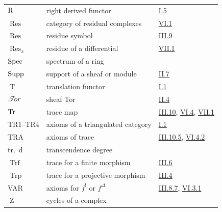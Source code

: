 \begin{longtable}{@{}l p{8cm} l@{}}
	$\operatorname{R}$ & right derived functor & \hyperref[sec:1.5]{I.5} \\
	$\operatorname{Res}$ & category of residual complexes & \hyperref[sec:6.1]{VI.1} \\
	$\operatorname{Res}$ & residue symbol & \hyperref[sec:3.9]{III.9} \\
	$\operatorname{Res}_x$ & residue of a differential & \hyperref[sec:7.1]{VII.1} \\
	$\operatorname{Spec}$ & spectrum of a ring & \\
	$\operatorname{Supp}$ & support of a sheaf or module & \hyperref[sec:2.7]{II.7} \\
	$\operatorname{T}$ & translation functor & \hyperref[sec:1.1]{I.1} \\
	$\mathop{\mathscr{T}\!or}\nolimits$ & sheaf Tor & \hyperref[sec:2.4]{II.4}  \\
	$\operatorname{Tr}$ & trace map & \hyperref[sec:3.10]{III.10}, \hyperref[sec:6.4]{VI.4}, \hyperref[sec:7.1]{VII.1} \\
	TR1--TR4 & axioms of a triangulated category & \hyperref[sec:1.1]{I.1} \\
	TRA & axioms of trace & \hyperref[thm:3.10.5]{III.10.5}, \hyperref[thm:6.4.2]{VI.4.2} \\
	tr.\ d & transcendence degree & \\
	$\operatorname{Trf}$ & trace for a finite morphism & \hyperref[sec:3.6]{III.6} \\
	$\operatorname{Trp}$ & trace for a projective morphism & \hyperref[sec:3.4]{III.4} \\
	VAR & axioms for $f^!$ or $f^\Delta$ & \hyperref[thm:3.8.7]{III.8.7}, \hyperref[thm:6.3.1]{VI.3.1} \\
	$\operatorname{Z}$ & cycles of a complex & \\
\end{longtable}

